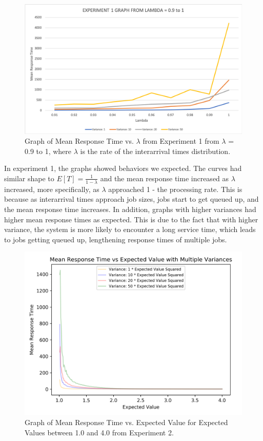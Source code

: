 \documentclass[12pt]{article}
\begin{document}
\begin{figure}[H]
\includegraphics[scale = 0.6]{Graph1ZoomedIn.png}
\caption{Graph of Mean Response Time vs. $\lambda$ from Experiment 1 from $\lambda$ = 0.9 to 1, where $\lambda$ is the rate of the interarrival times distribution.}
\end{figure}
\pagebreak
In experiment 1, the graphs showed behaviors we expected. The curves had similar shape to $E[T] = \frac{1}{1-\lambda}$ and the mean response time increased as $\lambda$ increased, more specifically, as $\lambda$ approached 1 - the processing rate. This is because as interarrival times approach job sizes, jobs start to get queued up, and the mean response time increases. In addition, graphs with higher variances had higher mean response times as expected. This is due to the fact that with higher variance, the system is more likely to encounter a long service time, which leads to jobs getting queued up, lengthening response times of multiple jobs. \\

\begin{figure}[H]
\includegraphics[width=\linewidth]{Analysis2_1.png}
\caption{Graph of Mean Response Time vs. Expected Value for Expected Values between 1.0 and 4.0 from Experiment 2.}
\end{figure}
\end{document}
